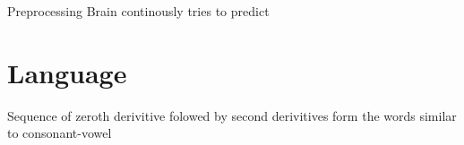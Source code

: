 \begin{frame}{Preprocessing}
    Brain continously tries to predict
    
    
    \section{Language}
        Sequence of zeroth derivitive folowed by second derivitives form the words similar to consonant-vowel

\end{frame}
